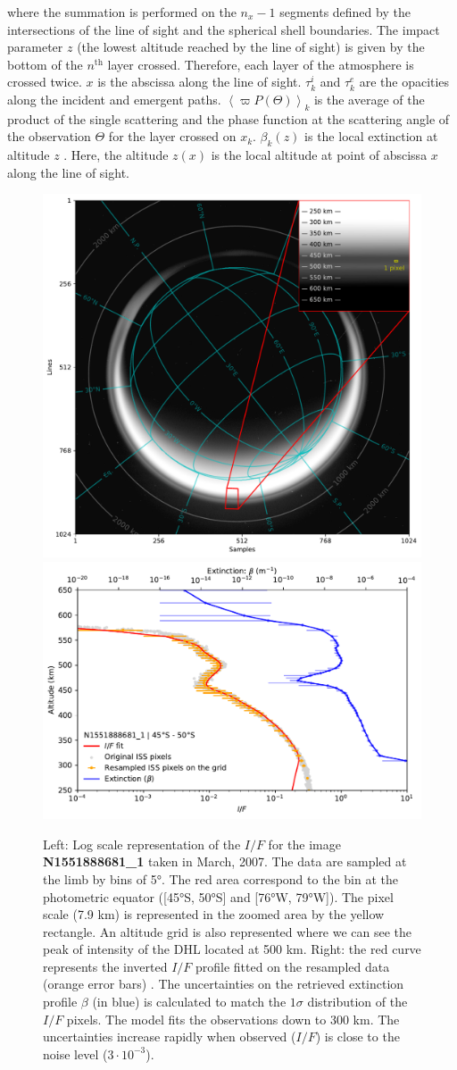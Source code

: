 where the summation is performed on the $n_x-1$ segments defined by the intersections of the line of sight and the spherical shell boundaries. The impact parameter $z$ (the lowest altitude reached by the line of sight) is given by the bottom of the $n^\mathrm{th}$ layer crossed. Therefore, each layer of the atmosphere is crossed twice. $x$ is the abscissa along the line of sight. $\tau^i_k$ and $\tau^e_k$ are the opacities along the incident and emergent paths.
$\left< \varpi P(\Theta)\right>_k$ is the average of the product of the single scattering and the phase function at the scattering angle of the observation $\Theta$ for the layer crossed on $x_k$.  $\beta_k(z)$ is the local extinction  at altitude $z$ . Here, the altitude $z(x)$ is the local altitude at point of abscissa $x$ along the line of sight.


\begin{figure}[!ht]
\includegraphics[width=.4\textwidth]{Fig/N1551888681_sampling}
\includegraphics[width=.57\textwidth]{Fig/Model_uncertainties}
\caption{Left: Log scale representation of the $I/F$  for the image
\textbf{N1551888681\_1} taken in March, 2007. The data are sampled at the limb by
bins of \ang{5}. The red area correspond to the bin at the photometric
equator ([\ang{45}S, \ang{50}S] and [\ang{76}W, \ang{79}W]). The pixel scale
(7.9 km) is represented in the zoomed area by the yellow rectangle.
An altitude grid is also represented where we can see the peak of intensity of the DHL
located at 500 km. Right: the red curve represents the inverted $I/F$ profile fitted
on the resampled data (orange error bars) .
The uncertainties on the retrieved extinction profile $\beta$ (in blue) is calculated to match the $1 \sigma$ distribution of the $I/F$ pixels. The model fits the observations down to 300 km.
The uncertainties increase rapidly when observed ($I/F$) is close
to the noise level ($3\cdot10^{-3}$).}
\label{fig:model_uncertainties}
\end{figure}



